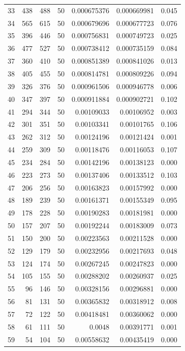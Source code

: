 \begin{tabular}{r r r r r r r}
33 & 438 & 488 & 50 & 0.000675376 & 0.000669981 & 0.045 \\
34 & 565 & 615 & 50 & 0.000679696 & 0.000677723 & 0.076 \\
35 & 396 & 446 & 50 & 0.000756831 & 0.000749723 & 0.025 \\
36 & 477 & 527 & 50 & 0.000738412 & 0.000735159 & 0.084 \\
37 & 360 & 410 & 50 & 0.000851389 & 0.000841026 & 0.013 \\
38 & 405 & 455 & 50 & 0.000814781 & 0.000809226 & 0.094 \\
39 & 326 & 376 & 50 & 0.000961506 & 0.000946778 & 0.006 \\
40 & 347 & 397 & 50 & 0.000911884 & 0.000902721 & 0.102 \\
41 & 294 & 344 & 50 & 0.00109033 & 0.00106952 & 0.003 \\
42 & 301 & 351 & 50 & 0.00103341 & 0.00101765 & 0.106 \\
43 & 262 & 312 & 50 & 0.00124196 & 0.00121424 & 0.001 \\
44 & 259 & 309 & 50 & 0.00118476 & 0.00116053 & 0.107 \\
45 & 234 & 284 & 50 & 0.00142196 & 0.00138123 & 0.000 \\
46 & 223 & 273 & 50 & 0.00137406 & 0.00133512 & 0.103 \\
47 & 206 & 256 & 50 & 0.00163823 & 0.00157992 & 0.000 \\
48 & 189 & 239 & 50 & 0.00161371 & 0.00155349 & 0.095 \\
49 & 178 & 228 & 50 & 0.00190283 & 0.00181981 & 0.000 \\
50 & 157 & 207 & 50 & 0.00192244 & 0.00183009 & 0.073 \\
51 & 150 & 200 & 50 & 0.00223563 & 0.00211528 & 0.000 \\
52 & 129 & 179 & 50 & 0.00232956 & 0.00217693 & 0.048 \\
53 & 124 & 174 & 50 & 0.00267245 & 0.00247823 & 0.000 \\
54 & 105 & 155 & 50 & 0.00288202 & 0.00260937 & 0.025 \\
55 & 96 & 146 & 50 & 0.00328156 & 0.00296881 & 0.000 \\
56 & 81 & 131 & 50 & 0.00365832 & 0.00318912 & 0.008 \\
57 & 72 & 122 & 50 & 0.00418481 & 0.00360062 & 0.000 \\
58 & 61 & 111 & 50 & 0.0048 & 0.00391771 & 0.001 \\
59 & 54 & 104 & 50 & 0.00558632 & 0.00435419 & 0.000 \\

\end{tabular}
